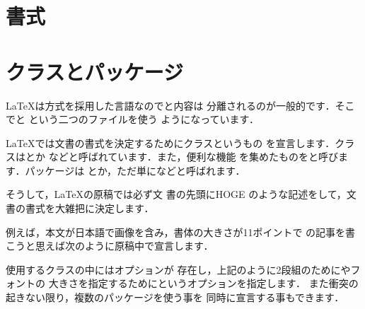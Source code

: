\section{書式}

\section{クラスとパッケージ}
{\LaTeX}は方式を採用した言語なのでと内容は
分離されるのが一般的です．そこでと
という二つのファイルを使う
ようになっています．

{\LaTeX}では文書の書式を決定するためにクラスというもの
を宣言します．クラスはとか
などと呼ばれています．また，便利な機能%
%
を集めたものをと呼びます．パッケージは
とか，ただ単になどと呼ばれます．

そうして，{\LaTeX}の原稿では必ず文
書の先頭にHOGE
のような記述をして，文書の書式を大雑把に決定します．


例えば，本文が日本語で画像を含み，書体の大きさが11ポイントで
の記事を書こうと思えば次のように原稿中で宣言します．


使用するクラスの中にはオプションが
存在し，上記のように2段組のためにやフォントの
大きさを指定するために\option{11pt}というオプションを指定します．
また衝突の起きない限り，複数のパッケージを使う事を
同時に宣言する事もできます．


